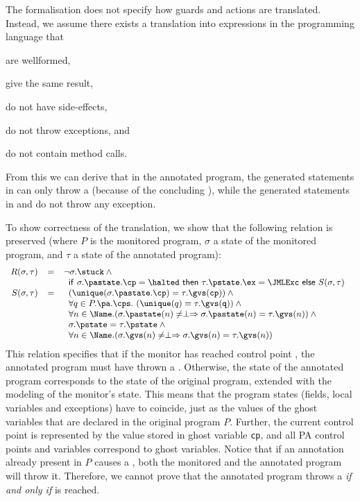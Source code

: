 The formalisation does not specify how guards and actions are
translated. Instead, we assume there exists a translation into
expressions in the programming language that
\begin{inparaenum}
\item are wellformed,
\item give the same result,
\item do not have side-effects,
\item do not throw exceptions, and
\item do not contain method calls.
\end{inparaenum}
From this we can derive that in the annotated program, the generated
statements in \preset can only throw a \JMLExc (because of the
concluding \Assert), while the generated statements in \postset
and \excset do not throw any exception.

To show correctness of the translation, we show that the following
relation is preserved (where \(P\) is the monitored program,
\(\sigma\) a state of the monitored program, and \(\tau\) a state
of the annotated program):
\[{\small
\begin{array}{rcl}
R(\sigma, \tau) & = & \neg \sigma.\stuck \:\wedge\\
& & \begin{array}[t]{l}
\mathsf{if\ }\sigma.\pastate.\cp = \halted
\mathsf{\ then\ }\tau.\pstate.\ex = \JMLExc
\mathsf{\ else\ }S(\sigma, \tau)
\end{array}\\
S(\sigma, \tau) & = &
\begin{array}[t]{l}
(\unique(\sigma.\pastate.\cp) = \tau.\gvs(\texttt{cp})) \:\wedge\\
\forall q \in P.\pa.\cps.\ (\unique(q) = \tau.\gvs(\texttt{q})) \:\wedge\\
\forall n \in \Name. (\sigma.\pastate(n) \not= \perp \Rightarrow
\sigma.\pastate(n) = \tau.\gvs(n)) \:\wedge\\
\sigma.\pstate = \tau.\pstate \:\wedge\\
\forall n \in \Name. (\sigma.\gvs(n) \not= \perp \Rightarrow
\sigma.\gvs(n) = \tau.\gvs(n))
\end{array}
\end{array}}
\]
This relation specifies that if the monitor has reached
control point  \halted, the annotated program must have thrown a
\JMLExc. Otherwise, the state of the annotated program corresponds to
the state of the original program, extended with the modeling of the
monitor's state. This means that the program states (fields,
local variables and exceptions) have to coincide, just as the values
of the ghost variables that are declared in the original program
\(P\). Further, the current control point is represented by the value
stored in ghost variable \texttt{cp}, and all PA control points and
variables correspond to ghost variables. Notice that if an annotation
already present in \(P\) causes a \JMLExc, both the monitored and the
annotated program will throw it.  Therefore, we cannot prove that the
annotated program throws a \JMLExc \emph{if and only if} \halted is
reached.


